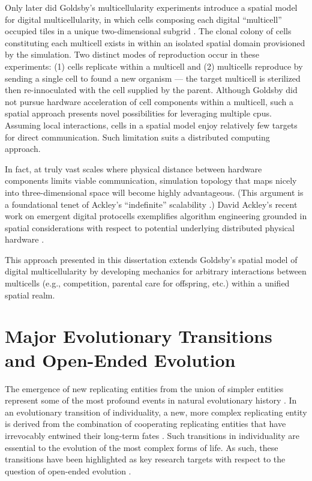 Only later did Goldsby's multicellularity experiments introduce a spatial model for digital multicellularity, in which cells composing each digital ``multicell'' occupied tiles in a unique two-dimensional subgrid \citep{goldsby2014evolutionary}.
The clonal colony of cells constituting each multicell exists in within an isolated spatial domain provisioned by the simulation.
Two distinct modes of reproduction occur in these experiments:
(1) cells replicate within a multicell and
(2) multicells reproduce by sending a single cell to found a new organism --- the target multicell is sterilized then re-innoculated with the cell supplied by the parent.
Although Goldsby did not pursue hardware acceleration of cell components within a multicell, such a spatial approach presents novel possibilities for leveraging multiple cpus.
Assuming local interactions, cells in a spatial model enjoy relatively few targets for direct communication.
Such limitation suits a distributed computing approach.

In fact, at truly vast scales where physical distance between hardware components limits viable communication, simulation topology that maps nicely into three-dimensional space will become highly advantageous.
(This argument is a foundational tenet of Ackley's ``indefinite'' scalability \citep{ackley2011pursue}.)
David Ackley's recent work on emergent digital protocells exemplifies algorithm engineering grounded in spatial considerations with respect to potential underlying distributed physical hardware \citep{ackley2018digital,ackley2019building}.

This approach presented in this dissertation extends Goldsby's spatial model of digital multicellularity by developing mechanics for arbitrary interactions between multicells (e.g., competition, parental care for offspring, etc.) within a unified spatial realm.

\section{Major Evolutionary Transitions and Open-Ended Evolution}

The emergence of new replicating entities from the union of simpler entities represent some of the most profound events in natural evolutionary history \citep{smith1997major}.
In an evolutionary transition of individuality, a new, more complex replicating entity is derived from the combination of cooperating replicating entities that have irrevocably entwined their long-term fates \citep{west2015major}.
Such transitions in individuality are essential to the evolution of the most complex forms of life.
As such, these transitions have been highlighted as key research targets with respect to the question of open-ended evolution \citep{ray1996evolving, banzhaf2016defining}.

